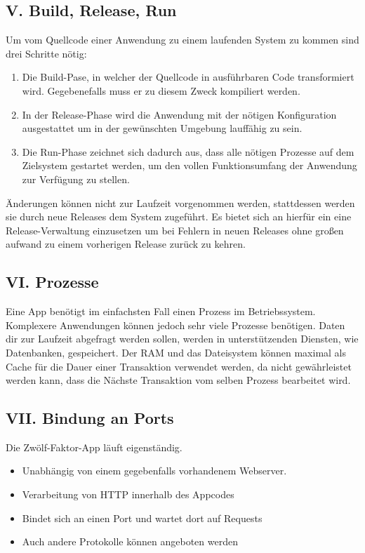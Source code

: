\documentclass[fleqn,10pt]{SelfArx} %
\begin{document}
\subsection{V. Build, Release, Run}
Um vom Quellcode einer Anwendung zu einem laufenden System zu kommen sind drei Schritte nötig:
\begin{enumerate}
	\item Die Build-Pase, in welcher der Quellcode in ausführbaren Code transformiert wird. Gegebenefalls muss er zu diesem Zweck kompiliert werden.
	\item In der Release-Phase wird die Anwendung mit der nötigen Konfiguration ausgestattet um in der gewünschten Umgebung lauffähig zu sein.
	\item Die Run-Phase zeichnet sich dadurch aus, dass alle nötigen Prozesse auf dem Zielsystem gestartet werden, um den vollen Funktionsumfang der Anwendung zur Verfügung zu stellen.
\end{enumerate}
Änderungen können nicht zur Laufzeit vorgenommen werden, stattdessen werden sie durch neue Releases dem System zugeführt. Es bietet sich an hierfür ein eine Release-Verwaltung einzusetzen um bei Fehlern in neuen Releases ohne großen aufwand zu einem vorherigen Release zurück zu kehren.
\subsection{VI. Prozesse}
Eine App benötigt im einfachsten Fall einen Prozess im Betriebssystem. Komplexere Anwendungen können jedoch sehr viele Prozesse benötigen. Daten dir zur Laufzeit abgefragt werden sollen, werden in unterstützenden Diensten, wie Datenbanken, gespeichert. Der RAM und das Dateisystem können maximal als Cache für die Dauer einer Transaktion verwendet werden, da nicht gewährleistet werden kann, dass die Nächste Transaktion vom selben Prozess bearbeitet wird.


\subsection{VII. Bindung an Ports}
Die Zwölf-Faktor-App läuft eigenständig.
\begin{itemize}
	\item Unabhängig von einem gegebenfalls vor\-han\-den\-em Web\-server.
	\item Verarbeitung von HTTP innerhalb des Appcodes
	\item Bindet sich an einen Port und wartet dort auf Requests
	\item Auch andere Protokolle können angeboten werden
\end{itemize}
\end{document}
